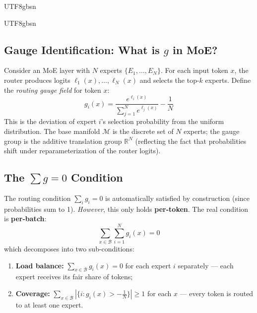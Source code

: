\documentclass[11pt,a4paper]{article}
\newcommand{\Manifold}{\mathcal{M}}
\newcommand{\RR}{\mathbb{R}}
\begin{document}
\begin{CJK}{UTF8}{gbsn}
{\begin{CJK}{UTF8}{gbsn}
\subsection{Gauge Identification: What is $g$ in MoE?}
Consider an MoE layer with $N$ experts $\{E_1, \ldots, E_N\}$. For each input token $x$,
the router produces logits $\ell_1(x), \ldots, \ell_N(x)$ and selects the top-$k$ experts.
Define the \textit{routing gauge field} for token $x$:
\begin{equation}
    g_i(x) = \frac{e^{\ell_i(x)}}{\sum_{j=1}^N e^{\ell_j(x)}} - \frac{1}{N}
\end{equation}
This is the deviation of expert $i$'s selection probability from the uniform distribution.
The base manifold $\Manifold$ is the discrete set of $N$ experts; the gauge group is the
additive translation group $\RR^N$ (reflecting the fact that probabilities shift under
reparameterization of the router logits).
\subsection{The $\sum g = 0$ Condition}
The routing condition $\sum_i g_i = 0$ is automatically satisfied by construction
(since probabilities sum to 1). \textit{However}, this only holds \textbf{per-token}.
The real condition is \textbf{per-batch}:
\begin{equation}
    \boxed{\sum_{x \in \mathcal{B}} \sum_{i=1}^N g_i(x) = 0}
\end{equation}
which decomposes into two sub-conditions:
\begin{enumerate}[label=(\alph*)]
    \item \textbf{Load balance:} $\sum_{x \in \mathcal{B}} g_i(x) = 0$ for each expert $i$
          separately --- each expert receives its fair share of tokens;
    \item \textbf{Coverage:} $\sum_{x \in \mathcal{B}} \left|\{i : g_i(x) > -\frac{1}{N}\}\right|
          \geq 1$ for each $x$ --- every token is routed to at least one expert.
\end{enumerate}

\end{CJK}}
\end{CJK}
\end{document}
